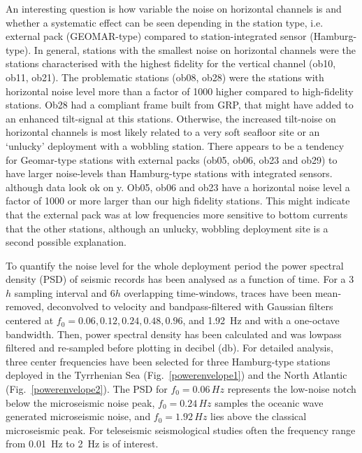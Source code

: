 \documentclass{article}
\begin{document}
{An interesting question is how variable the noise 
on horizontal channels is and whether a systematic 
effect can be seen depending in the station type,
i.e. external pack (GEOMAR-type) compared to 
station-integrated sensor (Hamburg-type). 
In general, stations with the smallest noise on horizontal channels 
were the stations characterised with the highest fidelity 
for the vertical channel (ob10, ob11, ob21).
The problematic stations (ob08, ob28) were the stations with
horizontal noise level more than a factor of 1000 higher compared to
high-fidelity stations. 
Ob28 had a compliant frame built from GRP, that might have added to
an enhanced tilt-signal at this stations.
Otherwise, the increased tilt-noise on horizontal channels 
is most likely related to a very soft seafloor site or 
an `unlucky' deployment with a wobbling station. There appears to be a
tendency for Geomar-type
stations with external packs (ob05, ob06, ob23 and ob29) to have
larger noise-levels than Hamburg-type stations with integrated sensors.
although data look ok on y.
Ob05, ob06 and ob23 have a horizontal noise level a factor 
of 1000 or more larger than our high fidelity stations.
This might indicate that the external pack was at low frequencies 
more sensitive to bottom currents that the other stations, 
although an unlucky, wobbling deployment site is a second 
possible explanation.

To quantify the noise level for the whole deployment period
the power spectral density (PSD) of seismic records has been analysed
as a function of time.
For a 3$h$ sampling interval and 6$h$ overlapping time-windows,
traces have been mean-removed, deconvolved to velocity 
and bandpass-filtered 
with Gaussian filters centered at $f_0=0.06, 0.12, 0.24, 0.48,
0.96$, and 1.92~Hz
and with  a one-octave bandwidth.
Then, power spectral  density has been calculated and  was 
lowpass filtered and re-sampled before plotting 
in decibel (db).
For detailed analysis, three 
center frequencies have been selected for three Hamburg-type stations deployed in 
the 
Tyrrhenian Sea (Fig.~\ref{powerenvelope1})
and the
North Atlantic (Fig.~\ref{powerenvelope2}).
The PSD for $f_0 = 0.06\, Hz$ represents the low-noise notch
below the microseismic noise peak, 
$f_0 = 0.24\, Hz$ samples the oceanic wave generated microseismic noise, 
and 
$f_0 = 1.92\, Hz$ lies above the classical microseismic peak.
For teleseismic seismological studies often 
the frequency range 
from 0.01~Hz to 2~Hz is of interest.

}
\end{document}
